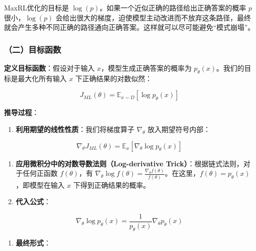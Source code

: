 MaxRL优化的目标是 \(\log(p)\)。如果一个近似正确的路径给出正确答案的概率 \(p\) 很小，\(\log(p)\) 会给出很大的梯度，迫使模型主动改进而不放弃这条路径，最终就会产生多种不同正确的路径通向正确答案。这样就可以尽可能避免``模式崩塌''。

\hypertarget{ux4e8cux76eeux6807ux51fdux6570-1}{%
\subsubsection{（二）目标函数}\label{ux4e8cux76eeux6807ux51fdux6570-1}}

\textbf{定义目标函数}：假设对于输入 \(x\)，模型生成正确答案的概率为 \(p_\theta(x)\)。我们的目标是最大化所有输入 \(x\) 下正确结果的对数似然：

\[
J_{ML}(\theta)=\mathbb{E}_{x\sim D}[\log p_\theta(x)]
\]

\textbf{推导过程}：

\begin{enumerate}
\def\labelenumi{\arabic{enumi}.}
\tightlist
\item
{}
  \textbf{利用期望的线性性质}：我们将梯度算子 \(\nabla_\theta\) 放入期望符号内部：
\end{enumerate}

\[
\nabla_\theta J_{ML}(\theta)=\mathbb{E}_x[\nabla_\theta \log p_\theta(x)]
\]

\begin{enumerate}
\def\labelenumi{\arabic{enumi}.}
\setcounter{enumi}{1}
\item
  \textbf{应用微积分中的对数导数法则（Log-derivative Trick）}：根据链式法则，对于任何正函数 \(f(\theta)\)，有 \(\nabla_\theta \log f(\theta)=\frac{\nabla_\theta f(\theta)}{f(\theta)}\)。在这里，\(f(\theta)=p_\theta(x)\)，即模型在输入 \(x\) 下得到正确结果的概率。
\item
{}
  \textbf{代入公式}：
\end{enumerate}

\[
\nabla_\theta \log p_\theta(x)=\frac{1}{p_\theta(x)}\nabla_\theta p_\theta(x)
\]

\begin{enumerate}
\def\labelenumi{\arabic{enumi}.}
\setcounter{enumi}{3}
\tightlist
\item
{}
  \textbf{最终形式}：
\end{enumerate}

